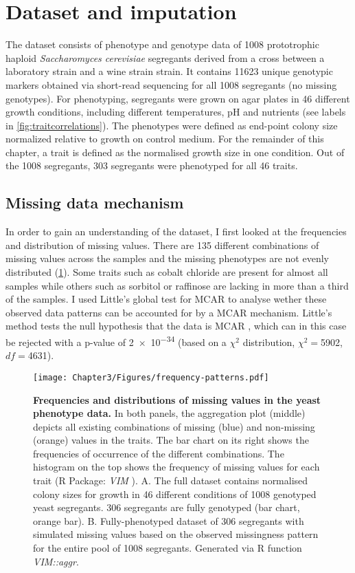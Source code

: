 \section{Dataset and imputation}
The dataset consists of phenotype and genotype data of \num{1008} prototrophic haploid \emph{Saccharomyces cerevisiae} segregants derived from a cross between a laboratory strain and a wine strain strain. It contains \num{11623} unique genotypic markers obtained via short-read sequencing for all \num{1008} segregants (no missing genotypes). For phenotyping, segregants were grown on agar plates in \num{46} different growth conditions, including different temperatures, pH and nutrients (see labels in \cref{fig:traitcorrelations}). The phenotypes were defined as end-point colony size normalized relative to growth on control medium. For the remainder of this chapter, a trait is defined as the normalised growth size in one condition. Out of the \num{1008} segregants, \num{303} segregants were phenotyped for all \num{46} traits.

\subsection{Missing data mechanism} 
In order to gain an understanding of the dataset, I first looked at the frequencies and distribution of missing values. There are \num{135} different combinations of missing values across the samples and the missing phenotypes are not evenly distributed (\cref{fig:missingness}). Some traits such as cobalt chloride are present for almost all samples while others such as sorbitol or raffinose are lacking in more than a third of the samples. I used Little's global test for MCAR to analyse wether these observed data patterns can be accounted for by a MCAR mechanism. Little's method tests the null hypothesis that the data is MCAR \citep{Little1988,Beaujean2015}, which can in this case be rejected with a p-value of \num{2e-34} (based on a \(\chi^2\) distribution, \(\chi^2=\)\num{5902}, \(df=\)\num{4631}). 

\begin{figure}[p]
	\centering
	\texttt{[image: Chapter3/Figures/frequency-patterns.pdf]}
	\caption[\textbf{Frequencies and distributions of missing values in the yeast phenotype data.}]{\textbf{Frequencies and distributions of missing values in the yeast phenotype data. }In both panels, the aggregation plot (middle) depicts all existing combinations of missing (blue) and non-missing (orange) values in the traits. The bar chart on its right shows the frequencies of occurrence of the different combinations. The histogram on the top shows the frequency of missing values for each trait (R Package: \emph{VIM} \citep{Templ2012}). A. The full dataset contains normalised colony sizes for growth in \num{46} different conditions of \num{1008} genotyped yeast segregants. \num{306} segregants are fully genotyped (bar chart, orange bar). B. Fully-phenotyped dataset of \num{306} segregants with simulated missing values based on the observed missingness pattern for the entire pool of \num{1008} segregants.  Generated via R function \textit{VIM::aggr}.}
 	\label{fig:missingness}
\end{figure}

